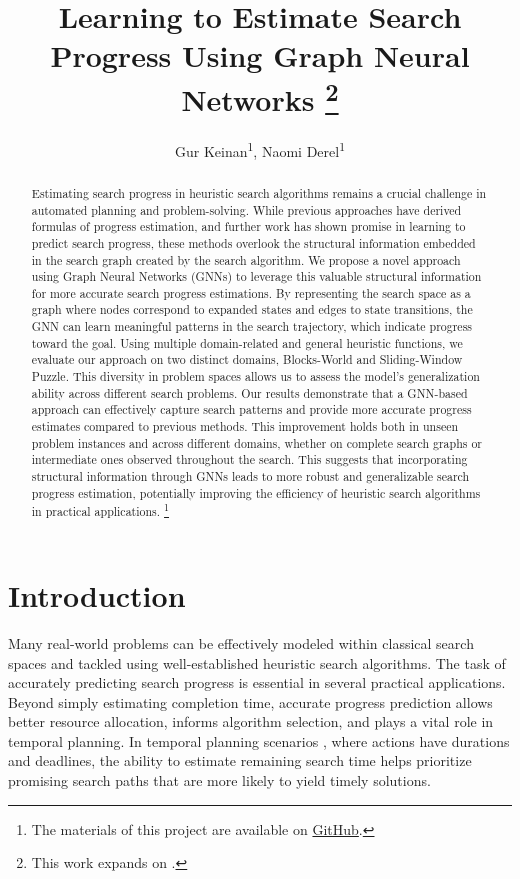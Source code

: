 \documentclass[letterpaper]{article}
\title{Learning to Estimate Search Progress Using Graph Neural Networks \thanks{This work expands on \citet{sudry2022learning}.}}
\author{
    Gur Keinan\textsuperscript{\rm 1},
    Naomi Derel\textsuperscript{\rm 1}
}
\begin{document}
\maketitle

\begin{abstract}
    Estimating search progress in heuristic search algorithms remains a crucial challenge in automated planning and problem-solving. While previous approaches have derived formulas of progress estimation, and further work has shown promise in learning to predict search progress, these methods overlook the structural information embedded in the search graph created by the search algorithm. 
    We propose a novel approach using Graph Neural Networks (GNNs) to leverage this valuable structural information for more accurate search progress estimations. By representing the search space as a graph where nodes correspond to expanded states and edges to state transitions, the GNN can learn meaningful patterns in the search trajectory, which indicate progress toward the goal. 
    Using multiple domain-related and general heuristic functions, we evaluate our approach on two distinct domains, Blocks-World and Sliding-Window Puzzle. This diversity in problem spaces allows us to assess the model's generalization ability across different search problems. 
    Our results demonstrate that a GNN-based approach can effectively capture search patterns and provide more accurate progress estimates compared to previous methods. This improvement holds both in unseen problem instances and across different domains, whether on complete search graphs or intermediate ones observed throughout the search.
    This suggests that incorporating structural information through GNNs leads to more robust and generalizable search progress estimation, potentially improving the efficiency of heuristic search algorithms in practical applications.
\footnote{The materials of this project are available on \href{https://github.com/GurKeinan/Artificial-Intelligence-and-Autonomous-Systems}{GitHub}.}
\end{abstract}

\section{Introduction}

Many real-world problems can be effectively modeled within classical search spaces and tackled using well-established heuristic search algorithms. The task of accurately predicting search progress is essential in several practical applications.
Beyond simply estimating completion time, accurate progress prediction allows better resource allocation, informs algorithm selection, and plays a vital role in temporal planning. In temporal planning scenarios \citep{cashmore2018temporal}, where actions have durations and deadlines, the ability to estimate remaining search time helps prioritize promising search paths that are more likely to yield timely solutions.
\end{document}
